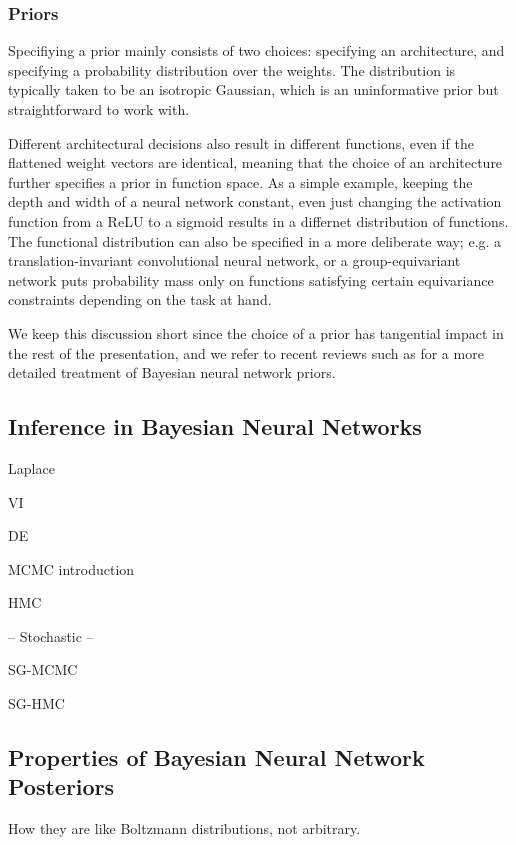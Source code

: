 \subsubsection{Priors}

Specifiying a prior mainly consists of two choices: specifying an architecture, and specifying a probability distribution over the weights. The distribution is typically taken to be an isotropic Gaussian, which is an uninformative prior but straightforward to work with. 

Different architectural decisions also result in different functions, even if the flattened weight vectors are identical, meaning that the choice of an architecture further specifies a prior in function space. As a simple example, keeping the depth and width of a neural network constant, even just changing the activation function from a ReLU to a sigmoid results in a differnet distribution of functions. The functional distribution can also be specified in a more deliberate way; e.g. a translation-invariant convolutional neural network, or a group-equivariant network \citep{cohenGroupEquivariantConvolutional2016} puts probability mass only on functions satisfying certain equivariance constraints depending on the task at hand. 

We keep this discussion short since the choice of a prior has tangential impact in the rest of the presentation, and we refer to recent reviews such as \citep{fortuinPriorsBayesianDeep2022} for a more detailed treatment of Bayesian neural network priors. 

\subsection{Inference in Bayesian Neural Networks} \label{section:bayesian_inference}

Laplace

VI

DE

MCMC introduction

HMC

-- Stochastic -- 

SG-MCMC

SG-HMC

\subsection{Properties of Bayesian Neural Network Posteriors} \label{section:bayesian_properties}

How they are like Boltzmann distributions, not arbitrary. 